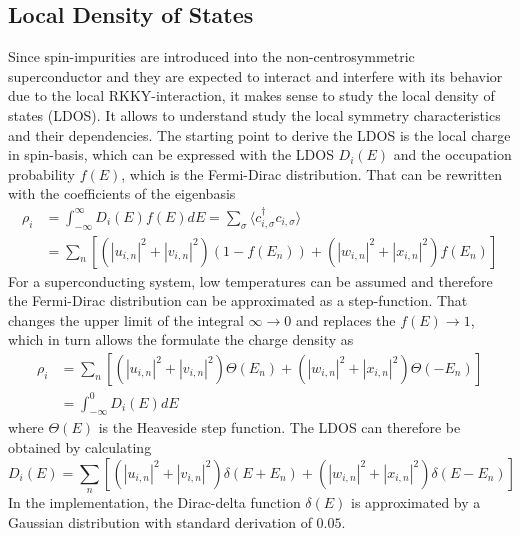 \subsection{Local Density of States}
Since spin-impurities are introduced into the non-centrosymmetric superconductor and they are expected to interact and interfere with its behavior due to the local RKKY-interaction, it makes sense to study the local density of states (LDOS).
It allows to understand study the local symmetry characteristics and their dependencies. \newline
The starting point to derive the LDOS is the local charge in spin-basis, which can be expressed with the LDOS $D_i(E)$ and the occupation probability $f(E)$, which is the Fermi-Dirac distribution.
That can be rewritten with the coefficients of the eigenbasis
\begin{align}\nonumber
    \rho_i &= \int_{-\infty}^{\infty} D_i(E)f(E)dE = \sum_{\sigma} \langle c^{\dag}_{i,\sigma} c_{i,\sigma}\rangle\\ \nonumber
    &= \sum_n\left[  
    \left( |u_{i,n}|^2 + |v_{i,n}|^2\right)\left( 1- f(E_n) \right) + \left(|w_{i,n}|^2 + |x_{i,n}|^2\right)f(E_n)
    \right]
\end{align}
For a superconducting system, low temperatures can be assumed and therefore the Fermi-Dirac distribution can be approximated as a step-function.
That changes the upper limit of the integral $\infty \rightarrow 0$ and replaces the $f(E) \rightarrow 1$, which in turn allows the formulate the charge density as 
\begin{align}\nonumber
    \rho_i &= \sum_n\left[  
    \left( |u_{i,n}|^2 + |v_{i,n}|^2\right)\Theta(E_n) + \left(|w_{i,n}|^2 + |x_{i,n}|^2\right)\Theta(-E_n)
    \right] \\ \nonumber
    &= \int_{-\infty}^0 D_i(E) dE
\end{align}
where $\Theta(E)$ is the Heaveside step function.
The LDOS can therefore be obtained by calculating
\begin{equation}\label{eq:LDOS_num}
    D_i(E) = \sum_n\left[  
    \left( |u_{i,n}|^2 + |v_{i,n}|^2\right)\delta(E+E_n) + \left(|w_{i,n}|^2 + |x_{i,n}|^2\right)\delta(E-E_n)
    \right]
\end{equation}
In the implementation, the Dirac-delta function $\delta(E)$ is approximated by a Gaussian distribution with standard derivation of $0.05$.

